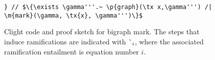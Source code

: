 \begin{figure}[t]
\begin{lstlisting}
} // $\{\exists \gamma'''.~ \p{graph}(\tx x,\gamma''') /| \m{mark}(\gamma, \tx{x}, \gamma''')\}$
\end{lstlisting}
\caption{Clight code and proof sketch for bigraph mark. {\color{magenta} The steps that induce
  ramifications are indicated with $\lightning_i$, where the associated ramification entailment is equation number $i$.}} %
\label{fig:markgraph}
\end{figure}
